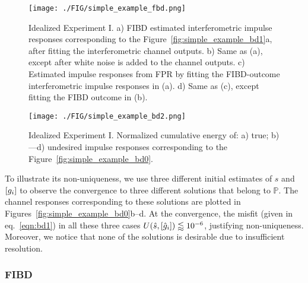 \begin{figure*}
	\centering
	{
	\texttt{[image: ./FIG/simple\_example\_fbd.png]}
		}
	{
	\begin{tikzpicture}
		
	\end{tikzpicture}
	}
	\caption{ Idealized Experiment I. 
		a) FIBD estimated interferometric 
		impulse responses corresponding to the Figure~\ref{fig:simple_example_bd1}a, 
		after fitting the
		interferometric channel outputs.
		b) Same as (a), except after white noise is added to the channel outputs.
		c) Estimated impulse responses from FPR by fitting the FIBD-outcome interferometric impulse responses in (a).
		d) Same as (c), except fitting the FIBD outcome in (b).
	}
	\label{fig:simple_example_fbd}
\end{figure*}




\begin{figure*}
	\begin{center}
		{
		\texttt{[image: ./FIG/simple\_example\_bd2.png]}
			}
		{
	\begin{tikzpicture}
		
	\end{tikzpicture}
		}
	\end{center}
	\caption{
		Idealized Experiment I.
	 Normalized cumulative energy of: a) true; b)---d) undesired impulse responses corresponding to the Figure~\ref{fig:simple_example_bd0}.
	 }
	\label{fig:simple_example_bd2}
\end{figure*}


To illustrate its non-uniqueness, we use 
three different initial estimates of 
$s$ and $\vecc{g_i}$ to observe the convergence to 
three different solutions that belong to $\mathbb{P}$.
%
The channel responses corresponding to these solutions are plotted in 
Figures~\ref{fig:simple_example_bd0}b--d.
%
At the convergence, the misfit (given in eq.~\ref{eqn:bd1}) 
in all these three cases $U(\hat{s},\vecc{\hat{g}_i})\lessapprox 10^{-6}$, justifying non-uniqueness.
%
Moreover, we notice that none of the 
solutions 
is desirable due to 
insufficient resolution.


\subsubsection*{FIBD}

